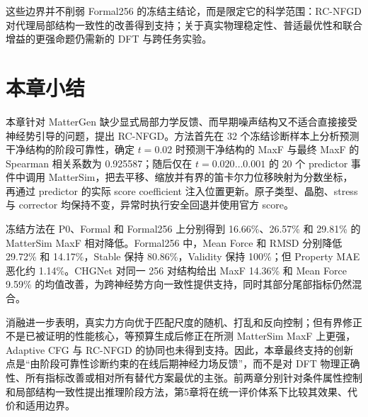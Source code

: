 这些边界并不削弱 Formal256 的冻结主结论，而是限定它的科学范围：RC-NFGD 对代理局部结构一致性的改善得到支持；关于真实物理稳定性、普适最优性和联合增益的更强命题仍需新的 DFT 与跨任务实验。

\section{本章小结}

本章针对 MatterGen 缺少显式局部力学反馈、而早期噪声结构又不适合直接接受神经势引导的问题，提出 RC-NFGD。方法首先在 32 个冻结诊断样本上分析预测干净结构的阶段可靠性，确定 \(t=0.02\) 时预测干净结构的 MaxF 与最终 MaxF 的 Spearman 相关系数为 0.925587；随后仅在 \(t=0.020\ldots0.001\) 的 20 个 predictor 事件中调用 Matter\allowbreak Sim，把去平移、缩放并有界的笛卡尔力位移映射为分数坐标，再通过 predictor 的实际 score coefficient 注入位置更新。原子类型、晶胞、stress 与 corrector 均保持不变，异常时执行安全回退并使用官方 score。

冻结方法在 P0、Formal 和 Formal256 上分别得到 16.66\%、26.57\% 和 29.81\% 的 Matter\allowbreak Sim MaxF 相对降低。Formal256 中，Mean Force 和 RMSD 分别降低 29.72\% 和 14.17\%，Stable 保持 80.86\%，Validity 保持 100\%；但 Property MAE 恶化约 1.14\%。CHGNet 对同一 256 对结构给出 MaxF 14.36\% 和 Mean Force 9.59\% 的均值改善，为跨神经势方向一致性提供支持，同时其部分尾部指标仍然混合。

消融进一步表明，真实力方向优于匹配尺度的随机、打乱和反向控制；但有界修正不是已被证明的性能核心，等预算生成后修正在所测 Matter\allowbreak Sim MaxF 上更强，Adaptive CFG 与 RC-NFGD 的协同也未得到支持。因此，本章最终支持的创新点是``由阶段可靠性诊断约束的在线后期神经力场反馈''，而不是对 DFT 物理正确性、所有指标改善或相对所有替代方案最优的主张。前两章分别针对条件属性控制和局部结构一致性提出推理阶段方法，第5章将在统一评价体系下比较其效果、代价和适用边界。
